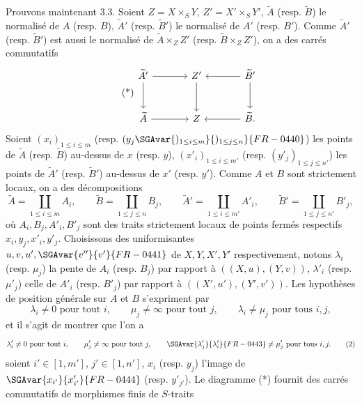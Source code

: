 Prouvons maintenant 3.3. Soient $Z=X\times_SY$, $Z'=X'\times_SY'$, $\widetilde A$ (resp. $\widetilde B$) le normalisé de $A$ (resp. $B$), $\widetilde A'$ (resp. $\widetilde B'$) le normalisé de $A'$ (resp. $B'$). Comme $\widetilde A'$ (resp. $\widetilde B'$) est aussi le normalisé de $\widetilde A\times_ZZ'$ (resp. $\widetilde B\times_ZZ'$), on a des carrés commutatifs
\begin{equation}
\tag{*}
\begin{tikzcd}[column sep=large,row sep=large]
\widetilde A' \arrow[r] \arrow[d] & Z' \arrow[d] & \widetilde B' \arrow[l] \arrow[d]\\
\widetilde A \arrow[r] & Z & \widetilde B . \arrow[l]
\end{tikzcd}
\end{equation}
Soient $(x_i)_{1\le i\le m}$ (resp. $(y_j\SGAvar{)_{1\le i\le m}}{)_{1\le j\le n}}{FR-0440}$) les points de $\widetilde A$ (resp. $\widetilde B$) au-dessus de $x$ (resp. $y$), $(x'_i)_{1\le i\le m'}$ (resp. $(y'_j)_{1\le j\le n'}$) les points de $\widetilde A'$ (resp. $\widetilde B'$) au-dessus de $x'$ (resp. $y'$). Comme $A$ et $B$ sont strictement locaux, on a des décompositions
\[
\widetilde A=\coprod_{1\le i\le m}A_i,\qquad
\widetilde B=\coprod_{1\le j\le n}B_j,\qquad
\widetilde A'=\coprod_{1\le i\le m'}A'_i,\qquad
\widetilde B'=\coprod_{1\le j\le n'}B'_j,
\]
où $A_i,B_j,A'_i,B'_j$ sont des traits strictement locaux de points fermés respectifs $x_i,y_j,x'_i,y'_j$. Choisissons des uniformisantes $u,v,u',\SGAvar{v''}{v'}{FR-0441}$ de $X,Y,X',Y'$ respectivement, notons $\lambda_i$ (resp. $\mu_j$) la pente de $A_i$ (resp. $B_j$) par rapport à $((X,u),(Y,v))$, $\lambda'_i$ (resp. $\mu'_j$) celle de $A'_i$ (resp. $B'_j$) par rapport à $((X',u'),(Y',v'))$. Les hypothèses de position générale sur $A$ et $B$ s'expriment par
\begin{equation}
\lambda_i\ne0\text{ pour tout }i,\qquad
\mu_j\ne\infty\text{ pour tout }j,\qquad
\lambda_i\ne\mu_j\text{ pour tous }i,j,
\tag{1}
\end{equation}
et il s'agit de montrer que l'on a
\begin{equation}
\lambda'_i\ne0\text{ pour tout }i,\qquad
\mu'_j\ne\infty\text{ pour tout }j,\qquad
\SGAvar{\lambda'_j}{\lambda'_i}{FR-0443}\ne\mu'_j\text{ pour tous }i,j.
\tag{2}
\end{equation}
soient $i'\in[1,m']$, $j'\in[1,n']$, $x_i$ (resp. $y_j$) l'image de $\SGAvar{x_{i'}}{x'_{i'}}{FR-0444}$ (resp. $y'_{j'}$). Le diagramme (*) fournit des carrés commutatifs de morphismes finis de $S$-traits
